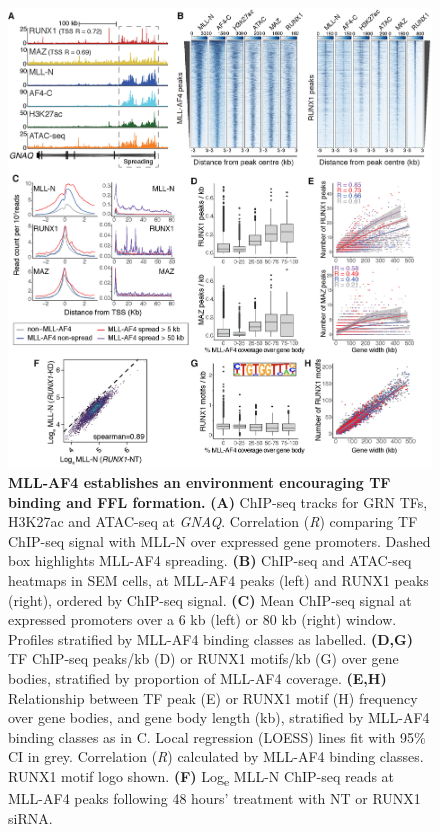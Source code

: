 \begin{figure}[htbp]
    \centering
    \includegraphics[width=\textwidth,height=\textheight,keepaspectratio]{figures/chapter4/chr4_ma4-TF-correlation.png}
    \caption[{MLL-AF4 establishes an environment encouraging TF binding and FFL formation.}]
    {\textbf{MLL-AF4 establishes an environment encouraging TF binding and FFL formation.} 
    \textbf{(A)} ChIP-seq tracks for GRN TFs, H3K27ac and ATAC-seq at \textit{GNAQ}. Correlation (\textit{R}) comparing TF ChIP-seq signal with MLL-N over expressed gene promoters. Dashed box highlights MLL-AF4 spreading.
    \textbf{(B)} ChIP-seq and ATAC-seq heatmaps in SEM cells, at MLL-AF4 peaks (left) and RUNX1 peaks (right), ordered by ChIP-seq signal.
    \textbf{(C)} Mean ChIP-seq signal at expressed promoters over a 6 kb (left) or 80 kb (right) window. Profiles stratified by MLL-AF4 binding classes as labelled.
    \textbf{(D,G)} TF ChIP-seq peaks/kb (D) or RUNX1 motifs/kb (G) over gene bodies, stratified by proportion of MLL-AF4 coverage.
    \textbf{(E,H)} Relationship between TF peak (E) or RUNX1 motif (H) frequency over gene bodies, and gene body length (kb), stratified by MLL-AF4 binding classes as in C. Local regression (LOESS) lines fit with 95\% CI in grey. Correlation (\textit{R}) calculated by MLL-AF4 binding classes. RUNX1 motif logo shown.
    \textbf{(F)} Log\textsubscript{e} MLL-N ChIP-seq reads at MLL-AF4 peaks following 48 hours’ treatment with NT or RUNX1 siRNA. 
    }
    \label{fig:ch4_ma4-TF-cor}
\end{figure}

